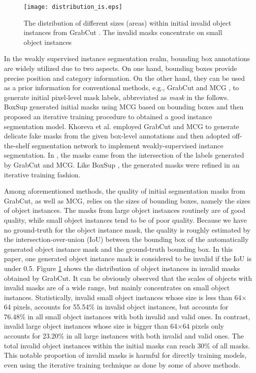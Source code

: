 \documentclass{article}
\begin{document}
\begin{figure}[t]
\centering\texttt{[image: distribution\_is.eps]}
\caption{The distribution of different sizes (areas) within initial invalid object instances from GrabCut \cite{GrabCut}. The invalid masks concentrate on small object instances}
\label{fig:distribution}
\end{figure}

In the weakly supervised instance segmentation realm, bounding box annotations are widely utilized due to two aspects.
On one hand, bounding boxes provide precise position and category information. On the other hand, they can be used as a prior information for conventional methods, e.g., GrabCut \cite{GrabCut} and MCG \cite{MCG}, to generate initial pixel-level mask labels, abbreviated as \emph{mask} in the follows. BoxSup \cite{Boxsup} generated initial masks using MCG based on bounding boxes and then proposed an iterative training procedure to obtained a good instance segmentation model.
Khoreva et al. \cite{Simple} employed GrabCut and MCG to generate delicate fake masks from the given box-level annotations and then adopted off-the-shelf segmentation network to implement weakly-supervised instance segmentation.
In \cite{Panoptic}, the masks came from the intersection of the labels generated by GrabCut and MCG.
Like BoxSup \cite{Boxsup}, the generated masks were refined in an iterative training fashion.

Among aforementioned methods, the quality of initial segmentation masks from GrabCut, as well as MCG, relies on the sizes of bounding boxes, namely the sizes of object instances.
The masks from large object instances routinely are of good quality, while small object instances tend to be of poor quality. Because we have no ground-truth for the object instance mask, the quality is roughly estimated by the intersection-over-union (IoU) between the bounding box of the automatically generated object instance mask and the ground-truth bounding box.
In this paper, one generated object instance mask is considered to be invalid if the IoU is under 0.5.
Figure \ref{fig:distribution} shows the distribution of object instances in invalid masks obtained by GrabCut.
It can be obviously observed that the scales of objects with invalid masks are of a wide range, but mainly concentrates on small object instances.
Statistically, invalid small object instances whose size is less than 64$\times$64 pixels, accounts for 55.54\% in invalid object instances, but accounts for 76.48\% in all small object instances with both invalid and valid ones.
In contrast, invalid large object instances whose size is bigger than 64$\times$64 pixels only accounts for 23.20\% in all large instances with both invalid and valid ones.
The total invalid object instances within the initial masks can reach 30\% of all masks.
This notable proportion of invalid masks is harmful for directly training models, even using the iterative training technique as done by some of above methods.
\end{document}

